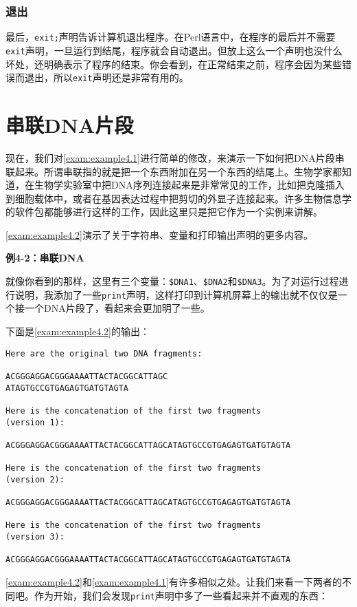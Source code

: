 \subsubsection{退出}
最后，\verb|exit;|声明告诉计算机退出程序。在Perl语言中，在程序的最后并不需要\verb|exit|声明，一旦运行到结尾，程序就会自动退出。但放上这么一个声明也没什么坏处，还明确表示了程序的结束。你会看到，在正常结束之前，程序会因为某些错误而退出，所以\verb|exit|声明还是非常有用的。

\section{串联DNA片段}
现在，我们对\autoref{exam:example4.1}进行简单的修改，来演示一下如何把DNA片段串联起来。所谓串联指的就是把一个东西附加在另一个东西的结尾上。生物学家都知道，在生物学实验室中把DNA序列连接起来是非常常见的工作，比如把克隆插入到细胞载体中，或者在基因表达过程中把剪切的外显子连接起来。许多生物信息学的软件包都能够进行这样的工作，因此这里只是把它作为一个实例来讲解。

\autoref{exam:example4.2}演示了关于字符串、变量和打印输出声明的更多内容。

\textbf{例4-2：串联DNA}


就像你看到的那样，这里有三个变量：\verb|$DNA1|、\verb|$DNA2|和\verb|$DNA3|。为了对运行过程进行说明，我添加了一些\verb|print|声明，这样打印到计算机屏幕上的输出就不仅仅是一个接一个DNA片段了，看起来会更加明了一些。

下面是\autoref{exam:example4.2}的输出：

\begin{lstlisting}
Here are the original two DNA fragments:

ACGGGAGGACGGGAAAATTACTACGGCATTAGC
ATAGTGCCGTGAGAGTGATGTAGTA

Here is the concatenation of the first two fragments
(version 1):

ACGGGAGGACGGGAAAATTACTACGGCATTAGCATAGTGCCGTGAGAGTGATGTAGTA

Here is the concatenation of the first two fragments
(version 2):

ACGGGAGGACGGGAAAATTACTACGGCATTAGCATAGTGCCGTGAGAGTGATGTAGTA

Here is the concatenation of the first two fragments
(version 3):

ACGGGAGGACGGGAAAATTACTACGGCATTAGCATAGTGCCGTGAGAGTGATGTAGTA
\end{lstlisting}

\autoref{exam:example4.2}和\autoref{exam:example4.1}有许多相似之处。让我们来看一下两者的不同吧。作为开始，我们会发现\verb|print|声明中多了一些看起来并不直观的东西：

